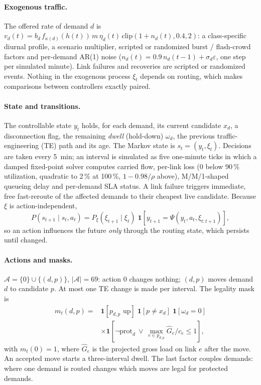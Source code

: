 \paragraph{Exogenous traffic.}
The offered rate of demand $d$ is
$v_d(t)=b_d\,f_{\kappa(d)}(h(t))\,m\,\eta_d(t)\,\mathrm{clip}(1+n_d(t),0.4,2)$:
a class-specific diurnal profile, a scenario multiplier, scripted or randomized
burst / flash-crowd factors and per-demand AR(1) noise
($n_d(t)=0.9\,n_d(t-1)+\sigma_d\varepsilon$, one step per simulated minute).
Link failures and recoveries are scripted or randomized events. Nothing in the
exogenous process $\xi_t$ depends on routing, which makes comparisons between
controllers exactly paired.

\paragraph{State and transitions.}
The controllable state $y_t$ holds, for each demand, its current candidate
$x_d$, a disconnection flag, the remaining \emph{dwell} (hold-down) $\omega_d$,
the previous traffic-engineering (TE) path and its age. The Markov state is
$s_t=(y_t,\xi_t)$. Decisions are taken every \SI{5}{min}; an interval is
simulated as five one-minute ticks in which a damped fixed-point solver
computes carried flow, per-link loss
($0$ below 90\,\% utilization, quadratic to 2\,\% at 100\,\%, $1-0.98/\rho$
above), M/M/1-shaped queueing delay and per-demand SLA status. A link failure
triggers immediate, free fast-reroute of the affected demands to their
cheapest live candidate. Because $\xi$ is action-independent,
\begin{equation}
P(s_{t+1}\mid s_t,a_t)=P_\xi(\xi_{t+1}\mid\xi_t)\;
\mathbf{1}\!\left[y_{t+1}=\Psi(y_t,a_t,\xi_{t:t+1})\right],
\label{eq:transition}
\end{equation}
so an action influences the future \emph{only} through the routing state,
which persists until changed.

\paragraph{Actions and masks.}
$\mathcal A=\{0\}\cup\{(d,p)\}$, $|\mathcal A|=69$: action $0$ changes nothing;
$(d,p)$ moves demand $d$ to candidate $p$. At most one TE change is made per
interval. The legality mask is
\begin{equation}
\begin{split}
m_t(d,p)={}&\mathbf{1}[\text{$p_{d,p}$ up}]\;\mathbf{1}[p\neq x_d]\;\mathbf{1}[\omega_d=0]\\
&\times\mathbf{1}\!\left[\neg\mathrm{prot}_d\ \vee\ \max_{e\in p_{d,p}}\hat G_e/c_e\le1\right],
\end{split}
\label{eq:mask}
\end{equation}
with $m_t(0)=1$, where $\hat G_e$ is the projected gross load on link $e$ after
the move. An accepted move starts a three-interval dwell. The last factor
couples demands: where one demand is routed changes which moves are legal for
protected demands.

